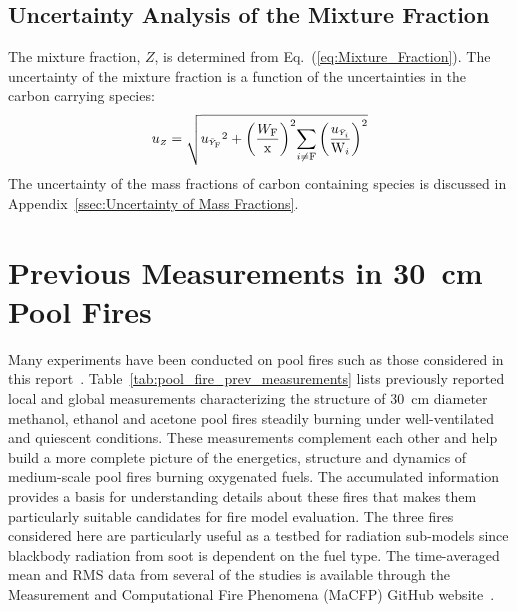 \documentclass[12pt]{article}
\begin{document}
\subsection{Uncertainty Analysis of the Mixture Fraction}\label{sec:Uncertainty_Mix_Frac}

The mixture fraction, $Z$, is determined from Eq.~(\ref{eq:Mixture_Fraction}). The uncertainty of the mixture fraction is a function of the uncertainties in the carbon carrying species:
\begin{equation}
\label{eq:mixture_frac_uncertainty}
u_{\scriptscriptstyle Z}=\sqrt{{u_{\scriptscriptstyle \bar{Y}_{\rm F}}}^2+{\left(\frac{W_{\rm F}}{\rm x}\right)}^2{\sum_{i\ne {\rm F}}{\left(\frac{u_{\scriptscriptstyle \bar{Y}_{i}}}{\textrm{W}_{i}} \right)}^2}}
\end{equation}
The uncertainty of the mass fractions of carbon containing species is discussed in Appendix~\ref{ssec:Uncertainty of Mass Fractions}.

\pagebreak

\section{Previous Measurements in 30~cm Pool Fires}
Many experiments have been conducted on pool fires such as those considered in this report~\cite{Weckman1996,Kim2019,Hamins1994, Klassen1994,Hamins1991,Hamins2016,Wang2019,Buch1997,Hogben1998,Weckman1989,Corlett1966,Sung2019}.  Table~\ref{tab:pool_fire_prev_measurements} lists previously reported local and global measurements characterizing the structure of 30~cm diameter methanol, ethanol and acetone pool fires steadily burning under well-ventilated and quiescent conditions. These measurements complement each other and help build a more complete picture of the energetics, structure and dynamics of medium-scale pool fires burning oxygenated fuels. The accumulated information provides a basis for understanding details about these fires that makes them particularly suitable candidates for fire model evaluation. The three fires considered here are particularly useful as a testbed for radiation sub-models since blackbody radiation from soot is dependent on the fuel type. The time-averaged mean and RMS data from several of the studies is available through the Measurement and Computational Fire Phenomena (MaCFP) GitHub website~\cite{MaCFp}.
\end{document}
